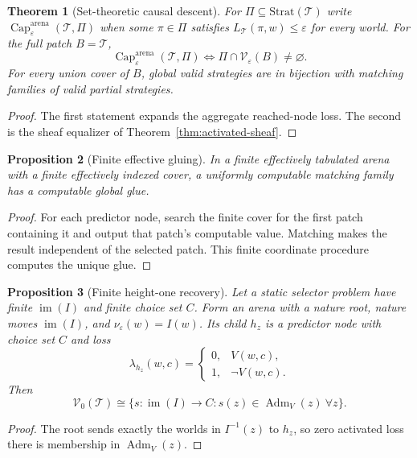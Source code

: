 \documentclass[11pt]{article}
\theoremstyle{plain}
\newtheorem{theorem}{Theorem}[section]
\newtheorem{proposition}[theorem]{Proposition}
\theoremstyle{definition}
\theoremstyle{remark}
\newcommand{\im}{\operatorname{im}}
\newcommand{\Capability}{\operatorname{Cap}}
\newcommand{\Adm}{\operatorname{Adm}}
\newcommand{\eps}{\varepsilon}
\begin{document}
\begin{theorem}[Set-theoretic causal descent]\label{thm:causal-descent}
For $\Pi\subseteq\mathrm{Strat}(\mathcal T)$ write
$\Capability^{\mathrm{arena}}_\eps(\mathcal T,\Pi)$ when some
$\pi\in\Pi$ satisfies $L_{\mathcal T}(\pi,w)\le\eps$ for every world. For the
full patch $B=\mathcal T$,
\[
\Capability^{\mathrm{arena}}_\eps(\mathcal T,\Pi)
\iff
\Pi\cap\mathscr V_\eps(B)\ne\varnothing.
\]
For every union cover of $B$, global valid strategies are in bijection with
matching families of valid partial strategies.
\end{theorem}

\begin{proof}
The first statement expands the aggregate reached-node loss. The second is the
sheaf equalizer of Theorem~\ref{thm:activated-sheaf}.
\end{proof}

\begin{proposition}[Finite effective gluing]\label{prop:finite-effective-gluing}
In a finite effectively tabulated arena with a finite effectively indexed cover,
a uniformly computable matching family has a computable global glue.
\end{proposition}

\begin{proof}
For each predictor node, search the finite cover for the first patch containing
it and output that patch's computable value. Matching makes the result
independent of the selected patch. This finite coordinate procedure computes the
unique glue.
\end{proof}

\begin{proposition}[Finite height-one recovery]\label{prop:heightone}
Let a static selector problem have finite $\im(I)$ and finite choice set $C$.
Form an arena with a nature root, nature moves $\im(I)$, and
$\nu_\varepsilon(w)=I(w)$. Its child $h_z$ is a predictor node with choice set
$C$ and loss
\[
\lambda_{h_z}(w,c)=
\begin{cases}0,&V(w,c),\\1,&\neg V(w,c).\end{cases}
\]
Then
\[
\mathscr V_0(\mathcal T)
\cong
\{s:\im(I)\to C:s(z)\in\Adm_V(z)\ \forall z\}.
\]
\end{proposition}

\begin{proof}
The root sends exactly the worlds in $I^{-1}(z)$ to $h_z$, so zero activated
loss there is membership in $\Adm_V(z)$.
\end{proof}
\end{document}
